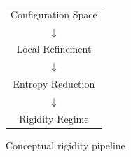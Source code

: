 \begin{figure}[h]
\centering
\begin{tabular}{c}
Configuration Space \\
$\downarrow$ \\
Local Refinement \\
$\downarrow$ \\
Entropy Reduction \\
$\downarrow$ \\
Rigidity Regime
\end{tabular}
\caption{Conceptual rigidity pipeline}
\end{figure}
